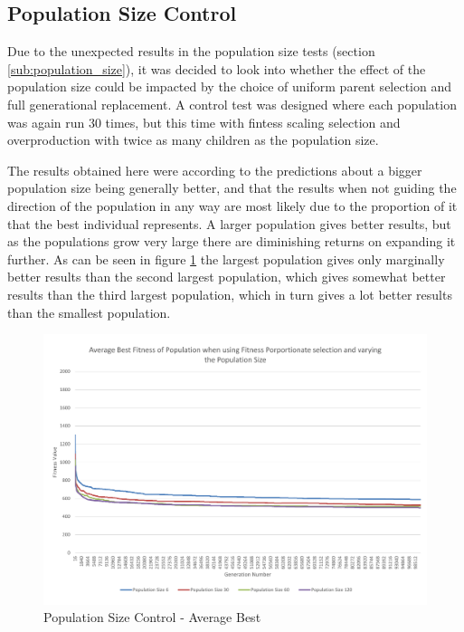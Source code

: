\clearpage

\subsection{Population Size Control} %
\label{sub:population_size_control}

Due to the unexpected results in the population size tests (section \ref{sub:population_size}), it was decided to look into whether the effect of the population size could be impacted by the choice of uniform parent selection and full generational replacement. A control test was designed where each population was again run 30 times, but this time with fintess scaling selection and overproduction with twice as many children as the population size.

The results obtained here were according to the predictions about a bigger population size being generally better, and that the results when not guiding the direction of the population in any way are most likely due to the proportion of it that the best individual represents. A larger population gives better results, but as the populations grow very large there are diminishing returns on expanding it further. As can be seen in figure \ref{fig:cpscab} the largest population gives only marginally better results than the second largest population, which gives somewhat better results than the third largest population, which in turn gives a lot better results than the smallest population.

\begin{landscape}
\begin{figure}[thbp]
	\centerline{\includegraphics[height=0.945\textwidth]{figures/CircleTests/PopulationSizeControl/CirclePopulationSizeControllAverageBest.pdf}}
	\caption{Population Size Control - Average Best}
	\label{fig:cpscab}
\end{figure}
\end{landscape}

